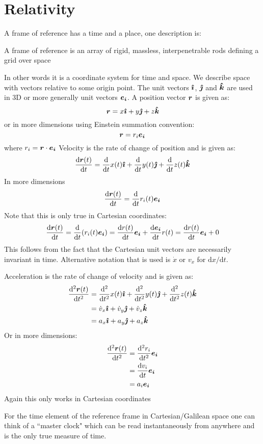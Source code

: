 \documentclass{article}
\begin{document}
    \section{Relativity}
    A frame of reference has a time and a place, one description is:
    \begin{displayquote}
        A frame of reference is an array of rigid, massless, interpenetrable rods defining a grid over space
    \end{displayquote}
    In other words it is a coordinate system for time and space. We describe space with vectors relative to some origin point.
    The unit vectors \(\bm{\hat{\imath}}\), \(\bm{\hat{\jmath}}\) and \(\bm{\hat{k}}\) are used in 3D or more generally unit vectors \(\bm{e_{i}}\).
    A position vector \(\bm{r}\) is given as:
    \[\bm{r} = x \bm{\hat{\imath}} + y \bm{\hat{\jmath}} + z \bm{\hat{k}}\]
    or in more dimensions using Einstein summation convention:
    \[\bm{r} = r_i\bm{e_{i}}\]
    where \(r_i = \bm{r}\cdot\bm{e_{i}}\)
    Velocity is the rate of change of position and is given as:
    \[\dv{\bm{r}(t)}{t} = \dv{t}x(t)\bm{\hat{\imath}} + \dv{t}y(t)\bm{\hat{\jmath}} + \dv{t}z(t)\bm{\hat{k}}\]
    In more dimensions
    \[\dv{\bm{r}(t)}{t} = \dv{t}r_i(t) \bm{e_{i}}\]
    Note that this is only true in Cartesian coordinates:
    \[\dv{\bm{r}(t)}{t} = \dv{t}(r_i(t)\bm{e_{i}}) = \dv{r(t)}{t}\bm{e_{i}} + \dv{\bm{e_{i}}}{t}r(t) = \dv{r(t)}{t}\bm{e_{i}}  + 0\]
    This follows from the fact that the Cartesian unit vectors are necessarily invariant in time.
    Alternative notation that is used is \(\dot x\) or \(v_x\) for \(\mathrm{d}x/\mathrm{d}t\).
    
    Acceleration is the rate of change of velocity and is given as:
    \begin{align*}
        \dv[2]{\bm{r}(t)}{t} &= \dv[2]{t}x(t)\bm{\hat{\imath}} + \dv[2]{t}y(t)\bm{\hat{\jmath}} + \dv[2]{t}z(t)\bm{\hat{k}}\\
        &= \dot v_x\bm{\hat{\imath}} + \dot v_y\bm{\hat{\jmath}} + \dot v_z\bm{\hat{k}}\\
        &= a_x\bm{\hat{\imath}} + a_y\bm{\hat{\jmath}} + a_z\bm{\hat{k}}
    \end{align*}
    Or in more dimensions:
    \begin{align*}
        \dv[2]{\bm{r}(t)}{t} &= \dv[2]{r_i}{t}\bm{e_{i}}\\
        &= \dv{v_i}{t}\bm{e_{i}}\\
        &= a_i\bm{e_{i}}
    \end{align*}
    Again this only works in Cartesian coordinates
    
    For the time element of the reference frame in Cartesian/Galilean space one can think of a ``master clock" which can be read instantaneously from anywhere and is the only true measure of time.
    
\end{document}
